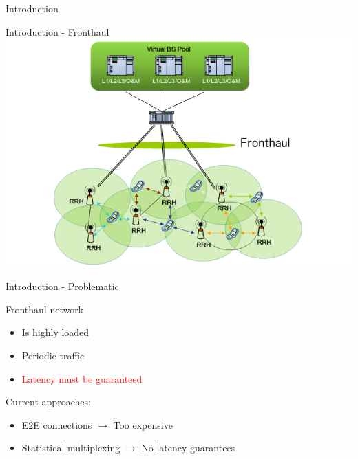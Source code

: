 \documentclass[10 pt]{beamer}
\begin{document}
\begin{section}{Introduction}
\begin{frame}{Introduction - Fronthaul}
  \centering
  \includegraphics[scale=0.5]{CRAN}\\
  
\end{frame}

\begin{frame}{Introduction - Problematic}
  \centering
  
  
 \begin{multicols}{2}
Fronthaul network 
\begin{itemize}
\item Is highly loaded
\item Periodic traffic
\item \textcolor{red}{Latency must be guaranteed}
\end{itemize}
\vspace{0.5cm}
Current approaches: \begin{itemize}
\item E2E connections $\rightarrow$ Too expensive
\item Statistical multiplexing $\rightarrow$ No latency guarantees  
\end{itemize}
\end{multicols}

\end{frame}

\end{section}
\end{document}
